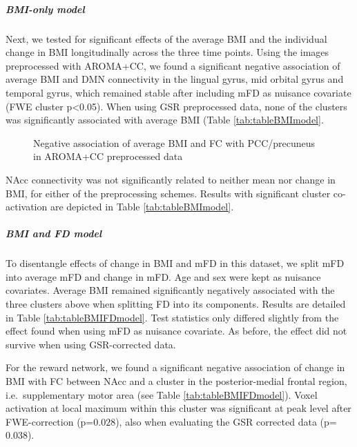 \documentclass[
]{article}
\begin{document}
\hypertarget{bmi-only-model}{%
\subparagraph{BMI-only model}\label{bmi-only-model}}

Next, we tested for significant effects of the average BMI and the individual change in BMI longitudinally across the three time points.
Using the images preprocessed with AROMA+CC, we found a significant negative association of average BMI and DMN connectivity in the lingual gyrus, mid orbital gyrus and temporal gyrus, which remained stable after including mFD as nuisance covariate (FWE cluster p\textless0.05). When using GSR preprocessed data, none of the clusters was significantly associated with average BMI (Table \ref{tab:tableBMImodel}.

\begin{figure}
\caption{Negative association of average BMI and FC with PCC/precuneus in AROMA+CC preprocessed data}\label{fig:BMIagesexPCCccavgBMIdeact}
\end{figure}

NAcc connectivity was not significantly related to neither mean nor change in BMI, for either of the preprocessing schemes.
Results with significant cluster co-activation are depicted in Table \ref{tab:tableBMImodel}.

\hypertarget{bmi-and-fd-model}{%
\subparagraph{BMI and FD model}\label{bmi-and-fd-model}}

To disentangle effects of change in BMI and mFD in this dataset, we split mFD into average mFD and change in mFD. Age and sex were kept as nuisance covariates.
Average BMI remained significantly negatively associated with the three clusters above when splitting FD into its components. Results are detailed in Table \ref{tab:tableBMIFDmodel}.
Test statistics only differed slightly from the effect found when using mFD as nuisance covariate.
As before, the effect did not survive when using GSR-corrected data.

For the reward network, we found a significant negative association of change in BMI with FC between NAcc and a cluster in the posterior-medial frontal region, i.e.~supplementary motor area (see Table \ref{tab:tableBMIFDmodel}). Voxel activation at local maximum within this cluster was significant at peak level after FWE-correction (p=\(0.028\)), also when evaluating the GSR corrected data (p=\(0.038\)).
\end{document}
